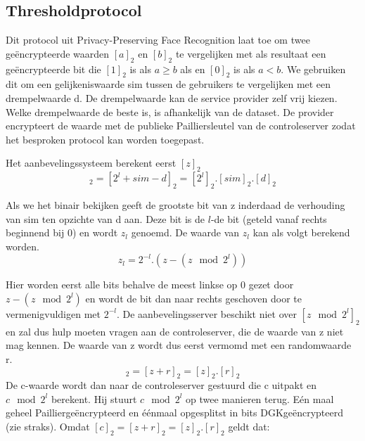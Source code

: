 \subsection{Thresholdprotocol}
\label{threshold}

Dit protocol uit Privacy-Preserving Face Recognition \cite{facerecog} laat toe om twee ge\"encrypteerde waarden $[a]_2$ en $[b]_2$ te vergelijken met als resultaat een ge\"encrypteerde bit die $[1]_2$ is als $a \geq b$ als en $[0]_2$ is als $a < b$. We gebruiken dit om een gelijkeniswaarde sim tussen de gebruikers te vergelijken met een drempelwaarde d. De drempelwaarde kan de service provider zelf vrij kiezen. Welke drempelwaarde de beste is, is afhankelijk van de dataset. De provider encrypteert de waarde met de publieke Pailliersleutel van de controleserver zodat het besproken protocol kan worden toegepast.

Het aanbevelingssysteem berekent eerst $[z]_2$
\begin{equation}
[z]_2 = [2^l + sim - d]_2 =[2^l]_2.[sim]_2.[d]_2  \end{equation}

Als we het binair bekijken geeft de grootste bit van z inderdaad de verhouding van sim ten opzichte van d aan.
Deze bit is de $l$-de bit (geteld vanaf rechts beginnend bij 0) en wordt $z_l$ genoemd. De waarde van $z_l$ kan als volgt berekend worden.
\begin{equation}
\label{zl}
z_l = 2^{-l}.(z-(z\mod 2^l)) \end{equation}

Hier worden eerst alle bits behalve de meest linkse op 0 gezet door $z-(z\mod 2^l)$ en wordt de bit dan naar rechts geschoven door te vermenigvuldigen met $2^{-l}$. De aanbevelingsserver beschikt niet over $[z\mod 2^l]_2$ en zal dus hulp moeten vragen aan de controleserver, die de waarde van z niet mag kennen. De waarde van z wordt dus eerst vermomd met een randomwaarde r.
\begin{equation}
[c]_2= [z+r]_2 = [z]_2.[r]_2 \end{equation}
De c-waarde wordt dan naar de controleserver gestuurd die c uitpakt en $c\mod 2^l$ berekent. Hij stuurt $c\mod 2^l$ op twee manieren terug. E\'en maal geheel Paillierge\"encrypteerd en \'e\'enmaal opgesplitst in bits DGKge\"encrypteerd (zie straks). Omdat $[c]_2= [z+r]_2 = [z]_2.[r]_2$ geldt dat:

